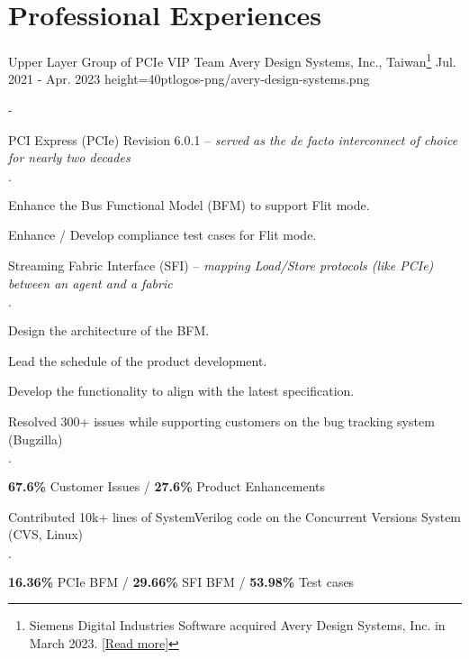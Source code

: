 \documentclass{cvclass}
\begin{document}
\makeinfo


\section{Professional Experiences}

    {Upper Layer Group of PCIe VIP Team}
    {Avery Design Systems, Inc., Taiwan\footnote{Siemens Digital Industries Software acquired Avery Design Systems, Inc. in March 2023. \href{https://newsroom.sw.siemens.com/en-US/siemens-avery-design-systems/}{[Read more]}}}
    {Jul. 2021 - Apr. 2023}
    {height=40pt}{logos-png/avery-design-systems.png}
\begin{plainitemize}{-}
    \item PCI Express\textsuperscript{\tiny\textregistered} (PCIe) Revision 6.0.1 -- \textit{served as the de facto interconnect of choice for nearly two decades}
    \begin{plainitemize}{\(\cdot\)}
        \item Enhance the Bus Functional Model (BFM) to support Flit mode.
        \item Enhance / Develop compliance test cases for Flit mode.
    \end{plainitemize}
    \item Streaming Fabric Interface (SFI) -- \textit{mapping Load/Store protocols (like PCIe) between an agent and a fabric}
    \begin{plainitemize}{\(\cdot\)}
        \item Design the architecture of the BFM.
        \item Lead the schedule of the product development.
        \item Develop the functionality to align with the latest specification.
    \end{plainitemize}
    \item Resolved 300+ issues while supporting customers on the bug tracking system (Bugzilla)
    \begin{plainitemize}{\(\cdot\)}
        \item {\textbf{67.6\%} Customer Issues / \textbf{27.6\%} Product Enhancements}
    \end{plainitemize}
    \item Contributed 10k+ lines of SystemVerilog code on the Concurrent Versions System (CVS, Linux)
    \begin{plainitemize}{\(\cdot\)}
        \item \textbf{16.36\%} PCIe BFM / \textbf{29.66\%} SFI BFM / \textbf{53.98\%} Test cases
    \end{plainitemize}
\end{plainitemize}
\end{document}
